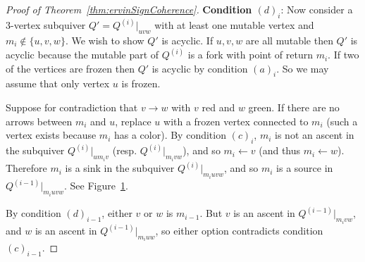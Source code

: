 \documentclass[12pt]{amsart}
\theoremstyle{definition}
\theoremstyle{remark}
\numberwithin{equation}{section}
\begin{document}
\begin{proof}[Proof of Theorem~\ref{thm:ervinSignCoherence}]
\textbf{Condition $(d)_i$}:
Now consider a $3$-vertex subquiver $Q' = Q^{(i)}|_{uvw}$ with at least one mutable vertex and $m_i \not \in \{u,v,w\}$. 
We wish to show $Q'$ is acyclic.
If $u,v,w$ are all mutable then $Q'$ is acyclic because the mutable part of $Q^{(i)}$ is a fork with point of return $m_i$.
If two of the vertices are frozen then $Q'$ is acyclic by condition $(a)_i$. 
So we may assume that only vertex $u$ is frozen.

Suppose for contradiction that $v \rightarrow w$ with $v$ red and $w$ green.
If there are no arrows between $m_i$ and $u$, replace $u$ with a frozen vertex connected to $m_i$ (such a vertex exists because $m_i$ has a color). 
By condition $(c)_i$, $m_i$ is not an ascent in the subquiver $Q^{(i)}|_{um_iv}$ (resp. $Q^{(i)}|_{m_ivw}$), and so $m_i \leftarrow v$ (and thus $m_i \leftarrow w$).
Therefore $m_i$ is a sink in the subquiver $Q^{(i)}|_{m_iuvw}$, and so $m_i$ is a source in $Q^{(i-1)}|_{m_iuvw}$. See Figure~\ref{fig: Vortices in induction}.

\begin{figure}[h]
\hspace{3cm}
\centering
\label{fig: Vortices in induction}
\end{figure}

By condition $(d)_{i-1}$, either $v$ or $w$ is $m_{i-1}$.
But $v$ is an ascent in $Q^{(i-1)}|_{m_ivw}$, and $w$ is an ascent in $Q^{(i-1)}|_{m_iuw}$, so either option contradicts condition $(c)_{i-1}$.
\end{proof}
\fi
\end{document}

